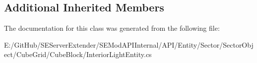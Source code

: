 \subsection*{Additional Inherited Members}


The documentation for this class was generated from the following file\+:\begin{DoxyCompactItemize}
\item 
E\+:/\+Git\+Hub/\+S\+E\+Server\+Extender/\+S\+E\+Mod\+A\+P\+I\+Internal/\+A\+P\+I/\+Entity/\+Sector/\+Sector\+Object/\+Cube\+Grid/\+Cube\+Block/Interior\+Light\+Entity.\+cs\end{DoxyCompactItemize}
